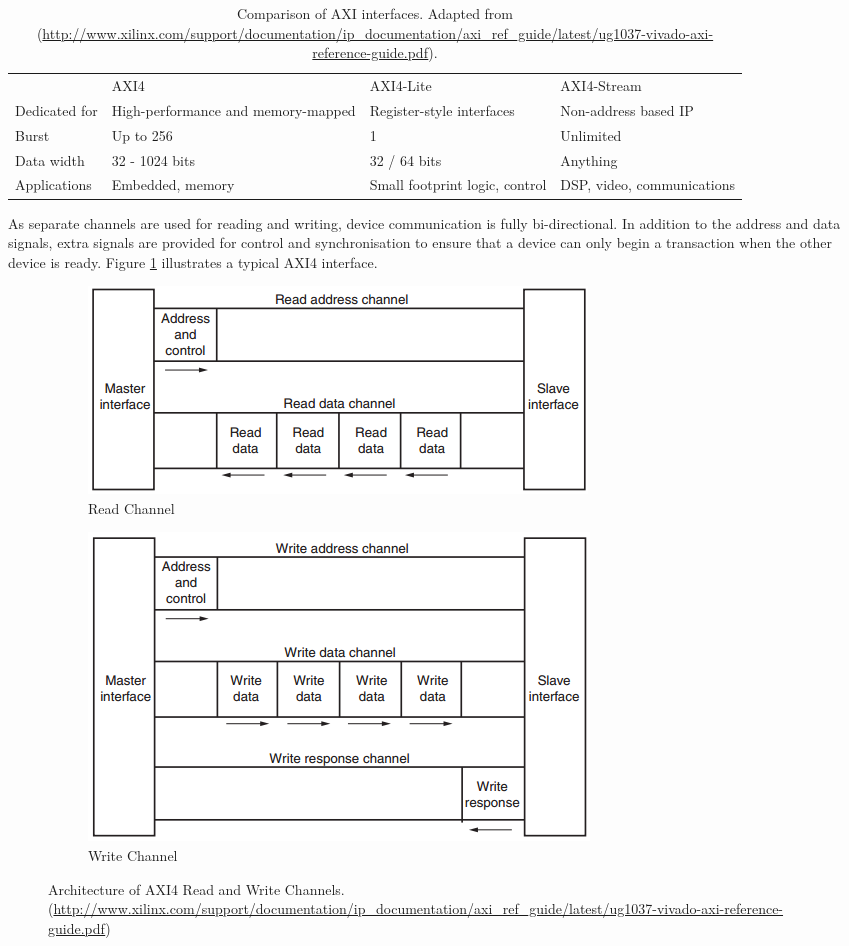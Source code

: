 \begin{table}[]
\centering
\caption{Comparison of AXI interfaces. Adapted from (\url{http://www.xilinx.com/support/documentation/ip_documentation/axi_ref_guide/latest/ug1037-vivado-axi-reference-guide.pdf}).}
\label{table:axi_comparison}
\begin{tabular}{llll}
              & AXI4                               & AXI4-Lite                      & AXI4-Stream                \\
Dedicated for & High-performance and memory-mapped & Register-style interfaces      & Non-address based IP       \\
Burst         & Up to 256                          & 1                              & Unlimited                  \\
Data width    & 32 - 1024 bits                     & 32 / 64 bits                   & Anything                   \\
Applications  & Embedded, memory                   & Small footprint logic, control & DSP, video, communications
\end{tabular}
\end{table}

As separate channels are used for reading and writing, device communication is fully bi-directional. In addition to the address and data signals, extra signals are provided for control and synchronisation to ensure that a device can only begin a transaction when the other device is ready. Figure \ref{fig:axi_architecture} illustrates a typical AXI4 interface. 

\begin{figure}
\centering
\begin{subfigure}{.5\textwidth}
  \centering
  \includegraphics[width=.4\linewidth]{./img/axi_read.png}
  \caption{Read Channel}
\end{subfigure}%
\begin{subfigure}{.5\textwidth}
  \centering
  \includegraphics[width=.4\linewidth]{./img/axi_write.png}
  \caption{Write Channel}
\end{subfigure}
\caption{Architecture of AXI4 Read and Write Channels. (\url{http://www.xilinx.com/support/documentation/ip_documentation/axi_ref_guide/latest/ug1037-vivado-axi-reference-guide.pdf})}
\label{fig:axi_architecture}
\end{figure}

